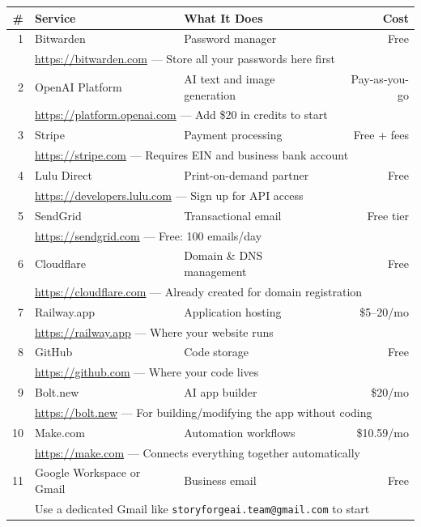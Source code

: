 \documentclass[12pt, letterpaper, oneside]{book}
\begin{document}
\begin{longtable}{rp{1.8in}p{2.5in}r}
\toprule
\textbf{\#} & \textbf{Service} & \textbf{What It Does} & \textbf{Cost} \\
\midrule
\endhead
1 & Bitwarden & Password manager & Free \\
  & \multicolumn{3}{l}{\small\url{https://bitwarden.com} --- Store all your passwords here first} \\
\midrule
2 & OpenAI Platform & AI text and image generation & Pay-as-you-go \\
  & \multicolumn{3}{l}{\small\url{https://platform.openai.com} --- Add \$20 in credits to start} \\
\midrule
3 & Stripe & Payment processing & Free + fees \\
  & \multicolumn{3}{l}{\small\url{https://stripe.com} --- Requires EIN and business bank account} \\
\midrule
4 & Lulu Direct & Print-on-demand partner & Free \\
  & \multicolumn{3}{l}{\small\url{https://developers.lulu.com} --- Sign up for API access} \\
\midrule
5 & SendGrid & Transactional email & Free tier \\
  & \multicolumn{3}{l}{\small\url{https://sendgrid.com} --- Free: 100 emails/day} \\
\midrule
6 & Cloudflare & Domain \& DNS management & Free \\
  & \multicolumn{3}{l}{\small\url{https://cloudflare.com} --- Already created for domain registration} \\
\midrule
7 & Railway.app & Application hosting & \$5--20/mo \\
  & \multicolumn{3}{l}{\small\url{https://railway.app} --- Where your website runs} \\
\midrule
8 & GitHub & Code storage & Free \\
  & \multicolumn{3}{l}{\small\url{https://github.com} --- Where your code lives} \\
\midrule
9 & Bolt.new & AI app builder & \$20/mo \\
  & \multicolumn{3}{l}{\small\url{https://bolt.new} --- For building/modifying the app without coding} \\
\midrule
10 & Make.com & Automation workflows & \$10.59/mo \\
   & \multicolumn{3}{l}{\small\url{https://make.com} --- Connects everything together automatically} \\
\midrule
11 & Google Workspace or Gmail & Business email & Free \\
   & \multicolumn{3}{l}{\small Use a dedicated Gmail like \texttt{storyforgeai.team@gmail.com} to start} \\
\bottomrule
\end{longtable}
\end{document}
